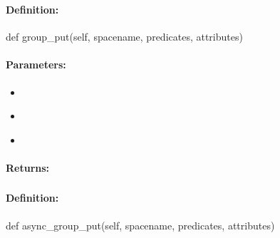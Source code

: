 \pagebreak
\subsubsection{}
\label{api:python:group_put}


\paragraph{Definition:}
\begin{pythoncode}
def group_put(self, spacename, predicates, attributes)
\end{pythoncode}

\paragraph{Parameters:}
\begin{itemize}[noitemsep]
\item {}\\

\item {}\\

\item {}\\

\end{itemize}

\paragraph{Returns:}


\pagebreak
\subsubsection{}
\label{api:python:async_group_put}


\paragraph{Definition:}
\begin{pythoncode}
def async_group_put(self, spacename, predicates, attributes)
\end{pythoncode}

